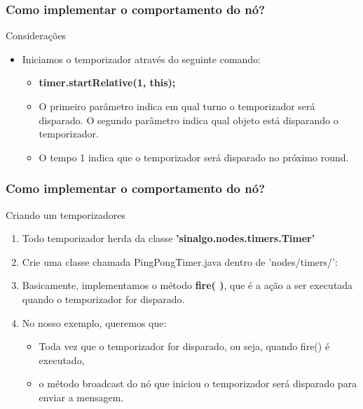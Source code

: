 \documentclass{beamer}
\begin{document}
\begin{frame}
	\frametitle{Como implementar o comportamento do nó?}

	\begin{exampleblock}{Considerações}
		\begin{itemize}
			\item Iniciamos o temporizador através do seguinte  comando:
			\begin{itemize}
				\item \textbf{timer.startRelative(1, this);}
				\item O primeiro parâmetro indica em qual turno o temporizador 
será disparado. O segundo parâmetro indica qual objeto  está disparando o temporizador.
				\item O tempo 1 indica que o temporizador será disparado no 
próximo round.
			\end{itemize}
			
		\end{itemize}
	\end{exampleblock}

\end{frame}

\begin{frame}
	\frametitle{Como implementar o comportamento do nó?}
	
	\begin{block}{Criando um temporizadores}
		\begin{enumerate}
			\item Todo temporizador herda da classe \textbf{'sinalgo.nodes.timers.Timer'}		
			\item Crie uma classe chamada PingPongTimer.java dentro de 'nodes/timers/':
			\item Basicamente, implementamos o método \textbf{fire( )}, que é a ação a ser executada quando o temporizador for disparado.
			
			\item No nosso exemplo, queremos que:
			\begin{itemize}
				\item Toda vez que o temporizador for disparado, ou seja, quando fire() é executado,
				\item o método broadcast do nó que iniciou o temporizador será disparado para enviar a mensagem.
			\end{itemize}
		\end{enumerate}
			
	\end{block}	
	
\end{frame}
\end{document}
